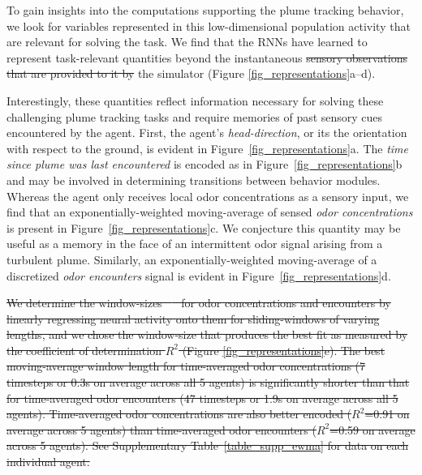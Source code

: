 \documentclass[5p,twocolumn,authoryear]{elsarticle}
\providecommand{\DIFaddtex}[1]{{\protect\color{blue}\uwave{#1}}} %
\providecommand{\DIFdeltex}[1]{{\protect\color{red}\sout{#1}}}                      %
\providecommand{\DIFaddbegin}{} %
\providecommand{\DIFaddend}{} %
\providecommand{\DIFdelbegin}{} %
\providecommand{\DIFdelend}{} %
\providecommand{\DIFadd}[1]{\texorpdfstring{\DIFaddtex{#1}}{#1}} %
\providecommand{\DIFdel}[1]{\texorpdfstring{\DIFdeltex{#1}}{}} %
\newcommand{\DIFscaledelfig}{0.5}
\newlength{\DIFdelgraphicswidth} %
\newlength{\DIFdelgraphicsheight} %
\newcommand{\DIFaddincludegraphics}[2][]{{\color{blue}\fbox{\DIFOincludegraphics[#1]{#2}}}} %
\newcommand{\DIFdelincludegraphics}[2][]{%
\sbox{\DIFdelgraphicsbox}{\DIFOincludegraphics[#1]{#2}}%
\settoboxwidth{\DIFdelgraphicswidth}{\DIFdelgraphicsbox} %
\settoboxtotalheight{\DIFdelgraphicsheight}{\DIFdelgraphicsbox} %
\scalebox{\DIFscaledelfig}{%
\parbox[b]{\DIFdelgraphicswidth}{\usebox{\DIFdelgraphicsbox}\\[-\baselineskip] \rule{\DIFdelgraphicswidth}{0em}}\llap{\resizebox{\DIFdelgraphicswidth}{\DIFdelgraphicsheight}{%
\setlength{\unitlength}{\DIFdelgraphicswidth}%
\begin{picture}(1,1)%
\thicklines\linethickness{2pt} %
{\color[rgb]{1,0,0}\put(0,0){\framebox(1,1){}}}%
{\color[rgb]{1,0,0}\put(0,0){\line( 1,1){1}}}%
{\color[rgb]{1,0,0}\put(0,1){\line(1,-1){1}}}%
\end{picture}%
}\hspace*{3pt}}} %
} %
\DeclareRobustCommand{\DIFaddbegin}{\DIFOaddbegin \let\includegraphics\DIFaddincludegraphics} %
\DeclareRobustCommand{\DIFaddend}{\DIFOaddend \let\includegraphics\DIFOincludegraphics} %
\DeclareRobustCommand{\DIFdelbegin}{\DIFOdelbegin \let\includegraphics\DIFdelincludegraphics} %
\DeclareRobustCommand{\DIFdelend}{\DIFOaddend \let\includegraphics\DIFOincludegraphics} %
\begin{document}
To gain insights into the computations supporting the plume tracking behavior, we look for variables represented in this low-dimensional population activity that are relevant for solving the task. 
We find that the RNNs have learned to represent task-relevant quantities beyond the instantaneous \DIFdelbegin \DIFdel{sensory observations that are provided to it by }\DIFdelend \DIFaddbegin \DIFadd{egocentric sensory observations received from }\DIFaddend the simulator (Figure \ref{fig_representations}a--d).

Interestingly, these quantities reflect information necessary for solving these challenging plume tracking tasks and require memories of past sensory cues encountered by the agent.
First, the agent's \textit{head-direction}, or its the orientation with respect to the ground, is evident in Figure~\ref{fig_representations}a.
The \textit{time since plume was last encountered} is encoded as in Figure~\ref{fig_representations}b and may be involved in determining transitions between behavior modules.
Whereas the agent only receives local odor concentrations as a sensory input, we find that an exponentially-weighted moving-average of sensed \textit{odor concentrations} is present in Figure~\ref{fig_representations}c.
We conjecture this quantity may be useful as a memory in the face of an intermittent odor signal arising from a turbulent plume.
Similarly, an exponentially-weighted moving-average of a discretized \textit{odor encounters} signal is evident in Figure~\ref{fig_representations}d.



\DIFdelbegin \DIFdel{We determine the window-sizes \mbox{%
\citep{ewma_pandas} }\hspace{0pt}%
for odor concentrations and encounters by linearly regressing neural activity onto them for sliding-windows of varying lengths, and we chose the window-size that produces the best fit as measured by the coefficient of determination $R^2$ (Figure \ref{fig_representations}e).
The best moving-average window length for time-averaged odor concentrations (7 timesteps or 0.3s on average across all 5 agents) is significantly shorter than that for time-averaged odor encounters (47 timesteps or 1.9s on average across all 5 agents). 
Time-averaged odor concentrations are also better encoded ($R^2$=0.91 on average across 5 agents) than time-averaged odor encounters ($R^2$=0.59 on average across 5 agents).
See Supplementary Table~\ref{table_supp_ewma} for data on each individual agent.
}%
\end{document}
